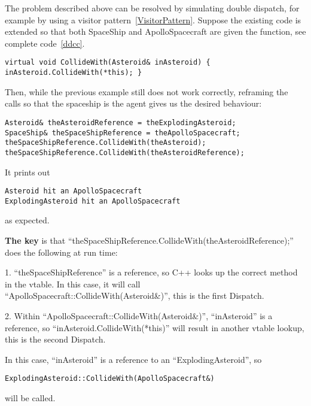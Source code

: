 \documentclass{book}
\begin{document}
The problem described above can be resolved by simulating double dispatch, 
for example by using a visitor pattern~\ref{VisitorPattern}. Suppose the existing code is extended so that both SpaceShip and ApolloSpacecraft are given the function, see complete code~\ref{ddcc}.
\begin{lstlisting}
virtual void CollideWith(Asteroid& inAsteroid) { inAsteroid.CollideWith(*this); }
\end{lstlisting}%
Then, while the previous example still does not work correctly, reframing the calls so that the spaceship is the agent gives us the desired behaviour:
\begin{lstlisting}
Asteroid& theAsteroidReference = theExplodingAsteroid;
SpaceShip& theSpaceShipReference = theApolloSpacecraft;
theSpaceShipReference.CollideWith(theAsteroid);
theSpaceShipReference.CollideWith(theAsteroidReference);
\end{lstlisting}%
It prints out 
{\color{gray}\begin{verbatim}
Asteroid hit an ApolloSpacecraft 
ExplodingAsteroid hit an ApolloSpacecraft
\end{verbatim}}
as expected. 

\textbf{The key} is that ``theSpaceShipReference.CollideWith(theAsteroidReference);'' does the following at run time:

1. ``theSpaceShipReference'' is a reference, so C++ looks up the correct method in the vtable. In this case, it will call ``ApolloSpacecraft::CollideWith(Asteroid\&)'', this is the first Dispatch.

2. Within ``ApolloSpacecraft::CollideWith(Asteroid\&)'', ``inAsteroid'' is a reference, so ``inAsteroid.CollideWith(*this)'' will result in another vtable lookup, this is the second Dispatch.

In this case, ``inAsteroid'' is a reference to an ``ExplodingAsteroid'',
so 
\begin{verbatim}
ExplodingAsteroid::CollideWith(ApolloSpacecraft&)
\end{verbatim}
will be called.
\end{document}
